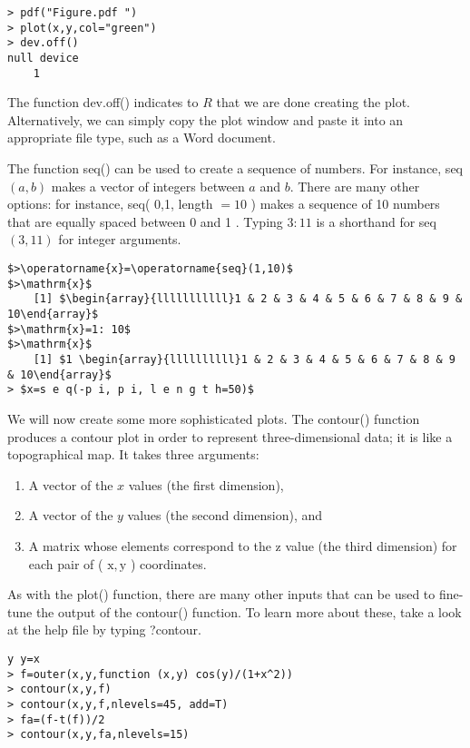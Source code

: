 \documentclass[10pt]{article}
\begin{document}
\begin{verbatim}
> pdf("Figure.pdf ")
> plot(x,y,col="green")
> dev.off()
null device
    1
\end{verbatim}

The function dev.off() indicates to $R$ that we are done creating the plot. Alternatively, we can simply copy the plot window and paste it into an appropriate file type, such as a Word document.

The function seq() can be used to create a sequence of numbers. For instance, seq $(a, b)$ makes a vector of integers between $a$ and $b$. There are many other options: for instance, seq( 0,1, length $=10$ ) makes a sequence of 10 numbers that are equally spaced between 0 and 1 . Typing $3: 11$ is a shorthand for seq $(3,11)$ for integer arguments.

\begin{verbatim}
$>\operatorname{x}=\operatorname{seq}(1,10)$
$>\mathrm{x}$
    [1] $\begin{array}{lllllllllll}1 & 2 & 3 & 4 & 5 & 6 & 7 & 8 & 9 & 10\end{array}$
$>\mathrm{x}=1: 10$
$>\mathrm{x}$
    [1] $1 \begin{array}{llllllllll}1 & 2 & 3 & 4 & 5 & 6 & 7 & 8 & 9 & 10\end{array}$
> $x=s e q(-p i, p i, l e n g t h=50)$
\end{verbatim}

We will now create some more sophisticated plots. The contour() function produces a contour plot in order to represent three-dimensional data; it is like a topographical map. It takes three arguments:

\begin{enumerate}
  \item A vector of the $x$ values (the first dimension),
  \item A vector of the $y$ values (the second dimension), and
  \item A matrix whose elements correspond to the z value (the third dimension) for each pair of ( $\mathrm{x}, \mathrm{y}$ ) coordinates.
\end{enumerate}

As with the plot() function, there are many other inputs that can be used to fine-tune the output of the contour() function. To learn more about these, take a look at the help file by typing ?contour.

\begin{verbatim}
y y=x
> f=outer(x,y,function (x,y) cos(y)/(1+x^2))
> contour(x,y,f)
> contour(x,y,f,nlevels=45, add=T)
> fa=(f-t(f))/2
> contour(x,y,fa,nlevels=15)
\end{verbatim}
\end{document}
